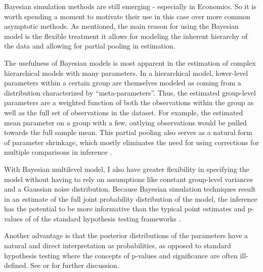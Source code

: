 \documentclass[12pt]{article}
\begin{document}
Bayesian simulation methods are still emerging - especially in Economics. So it is worth spending a moment to motivate their use in this case over more common asymptotic methods. As mentioned, the main reason for using the Bayesian model is the flexible treatment it allows for modeling the inherent hierarchy of the data and allowing for partial pooling in estimation.

The usefulness of Bayesian models is most apparent in the estimation of complex hierarchical models with many parameters.
In a hierarchical model, lower-level parameters within a certain group are themselves modeled as coming from a distribution characterized by ``meta-parameters''. Thus, the estimated group-level parameters are a weighted function of both the observations within the group as well as the full set of observations in the dataset. For example, the estimated mean parameter on a group with a few, outlying observations would be pulled towards the full sample mean. This partial pooling also serves as a natural form of parameter shrinkage, which mostly eliminates the need for using corrections for multiple comparisons in inference \citep{gelman_data_2006}.

With Bayesian multilevel model, I also have greater flexibility in specifying the model without having to rely on assumptions like constant group-level variances and a Gaussian noise distribution.  Because Bayesian simulation techniques result in an estimate of the full joint probability distribution of the model, the inference has the potential to be more informative than the typical point estimates and p-values of of the standard hypothesis testing frameworks \citep{kruschke_doing_2014}.

Another advantage is that the posterior distributions of the parameters have a natural and direct interpretation as probabilities, as opposed to standard hypothesis testing where the concepts of p-values and significance are often ill-defined. See \citet{kruschke_doing_2014} or \citet{gelman_bayesian_2013} for further discussion.


\end{document}
